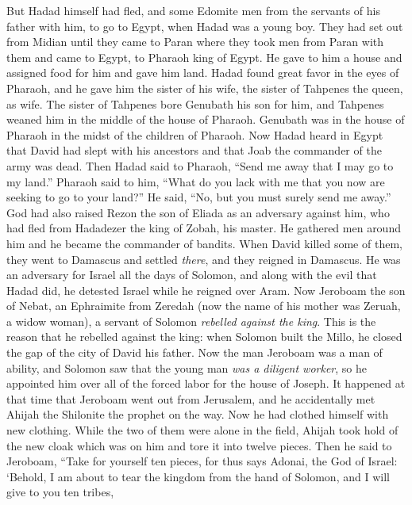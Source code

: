 \begin{biblechapter}
\verse But Hadad himself had fled, and some Edomite men from the servants of his father with him, to go to Egypt, when Hadad was a young boy.
\verse They had set out from Midian until they came to Paran where they took men from Paran with them and came to Egypt, to Pharaoh king of Egypt. He gave to him a house and assigned food for him and gave him land.
\verse Hadad found great favor in the eyes of Pharaoh, and he gave him the sister of his wife, the sister of Tahpenes the queen, as wife.
\verse The sister of Tahpenes bore Genubath his son for him, and Tahpenes weaned him in the middle of the house of Pharaoh. Genubath was in the house of Pharaoh in the midst of the children of Pharaoh.
\verse Now Hadad heard in Egypt that David had slept with his ancestors and that Joab the commander of the army was dead. Then Hadad said to Pharaoh, “Send me away that I may go to my land.”
\verse Pharaoh said to him, “What do you lack with me that you now are seeking to go to your land?” He said, “No, but you must surely send me away.”
\verse God had also raised Rezon the son of Eliada as an adversary against him, who had fled from Hadadezer the king of Zobah, his master.
\verse He gathered men around him and he became the commander of bandits. When David killed some of them, they went to Damascus and settled \textit{there}, and they reigned in Damascus.
\verse He was an adversary for Israel all the days of Solomon, and along with the evil that Hadad did, he detested Israel while he reigned over Aram.
 Now Jeroboam the son of Nebat, an Ephraimite from Zeredah (now the name of his mother was Zeruah, a widow woman), a servant of Solomon \textit{rebelled against the king}.
\verse This is the reason that he rebelled against the king: when Solomon built the Millo, he closed the gap of the city of David his father.
\verse Now the man Jeroboam was a man of ability, and Solomon saw that the young man \textit{was a diligent worker}, so he appointed him over all of the forced labor for the house of Joseph.
\verse It happened at that time that Jeroboam went out from Jerusalem, and he accidentally met Ahijah the Shilonite the prophet on the way. Now he had clothed himself with new clothing. While the two of them were alone in the field,
\verse Ahijah took hold of the new cloak which was on him and tore it into twelve pieces.
\verse Then he said to Jeroboam, “Take for yourself ten pieces, for thus says Adonai, the God of Israel: ‘Behold, I am about to tear the kingdom from the hand of Solomon, and I will give to you ten tribes,

\end{biblechapter}
